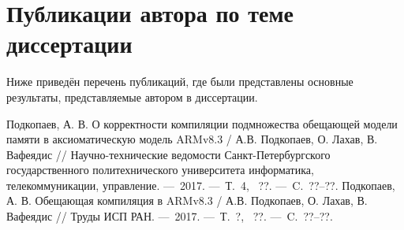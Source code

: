 





\section*{\LARGE Публикации автора по теме диссертации}

Ниже приведён перечень публикаций, где были представлены основные результаты, представляемые автором в диссертации. \\

\renewcommand{\bibsection}{\noindent \textbf{\refname}}

\renewcommand{\refname}{Статьи из \vakJournals}
\begin{thebibliography}{99}
 Подкопаев, А. В. О корректности компиляции подмножества обещающей модели памяти в аксиоматическую модель ARMv8.3 / А.В. Подкопаев, О. Лахав, В. Вафеядис // Научно-технические ведомости Санкт-Петербургского государственного политехнического университета информатика, телекоммуникации, управление. ---~2017. ---~Т.~4, \textnumero~??. ---~C.~??--??.
 Подкопаев, А. В. Обещающая компиляция в ARMv8.3 / А.В. Подкопаев, О. Лахав, В. Вафеядис // Труды ИСП РАН. ---~2017. ---~Т.~?, \textnumero~??. ---~C.~??--??.
\setcounter{firstbib}{\value{enumiv}}
\end{thebibliography}

